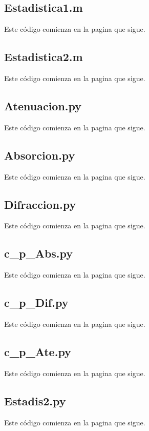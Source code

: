 \documentclass[12]{article}
\begin{document}
\subsection{Estadistica1.m}
Este código comienza en la pagina que sigue.
 
\subsection{Estadistica2.m}
Este código comienza en la pagina que sigue.

\subsection{Atenuacion.py}
Este código comienza en la pagina que sigue.
    
\subsection{Absorcion.py}
Este código comienza en la pagina que sigue.
 
\subsection{Difraccion.py}
Este código comienza en la pagina que sigue.
 
\subsection{c\_p\_Abs.py}
Este código comienza en la pagina que sigue.
    
\subsection{c\_p\_Dif.py}
Este código comienza en la pagina que sigue.
 
\subsection{c\_p\_Ate.py}
Este código comienza en la pagina que sigue.
 
\subsection{Estadis2.py}
Este código comienza en la pagina que sigue.
 
\end{document}
